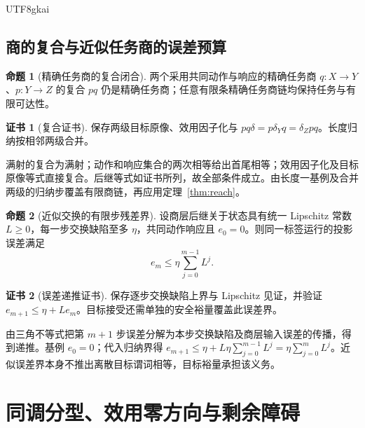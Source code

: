 \documentclass[12pt]{report}
\makeatletter
\theoremstyle{definition}
\newtheorem{proposition}{命题}[chapter]
\newtheorem{Certificate}{证书}[chapter]
\renewenvironment{proof}[1][\proofname]{\par
  \pushQED{\qed}\normalfont
  \topsep6\p@\@plus6\p@\relax
  \trivlist
  \item[\hskip\labelsep\normalfont #1\@addpunct{.}]\ignorespaces
}{
  \popQED\endtrivlist\@endpefalse
}
\makeatother
\begin{document}
\begin{CJK*}{UTF8}{gkai}
\section{商的复合与近似任务商的误差预算}
\begin{proposition}[精确任务商的复合闭合]
\label{prop:quotcomp}
两个采用共同动作与响应的精确任务商 \(q:X\to Y\)、\(p:Y\to Z\) 的复合 \(pq\) 仍是精确任务商；任意有限条精确任务商链均保持任务与有限可达性。
\end{proposition}
\begin{Certificate}[复合证书]
保存两级目标原像、效用因子化与
\(pq\delta=p\delta_Yq=\delta_Zpq\)。长度归纳按相邻两级合并。
\end{Certificate}
\begin{proof}
满射的复合为满射；动作和响应集合的两次相等给出首尾相等；效用因子化及目标原像等式直接复合。后继等式如证书所列，故全部条件成立。由长度一基例及合并两级的归纳步覆盖有限商链，再应用定理~\ref{thm:reach}。
\end{proof}

\begin{proposition}[近似交换的有限步残差界]
\label{prop:approx}
设商层后继关于状态具有统一 Lipschitz 常数 \(L\ge0\)，每一步交换缺陷至多 \(\eta\)，共同动作响应且 \(e_0=0\)。则同一标签运行的投影误差满足
\[
e_m\le\eta\sum_{j=0}^{m-1}L^j.
\]
\end{proposition}
\begin{Certificate}[误差递推证书]
保存逐步交换缺陷上界与 Lipschitz 见证，并验证 \(e_{m+1}\le\eta+Le_m\)。目标接受还需单独的安全裕量覆盖此误差界。
\end{Certificate}
\begin{proof}
由三角不等式把第 \(m+1\) 步误差分解为本步交换缺陷及商层输入误差的传播，得到递推。基例 \(e_0=0\)；代入归纳界得
\(e_{m+1}\le\eta+L\eta\sum_{j=0}^{m-1}L^j=\eta\sum_{j=0}^{m}L^j\)。近似误差界本身不推出离散目标谓词相等，目标裕量承担该义务。
\end{proof}

\chapter{同调分型、效用零方向与剩余障碍}
\label{sec:homology}

\end{CJK*}
\end{document}

